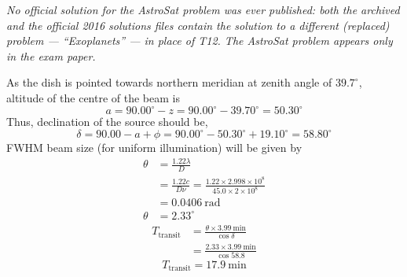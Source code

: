 \textit{No official solution for the AstroSat problem was ever published: both the archived and the official 2016 solutions files contain the solution to a different (replaced) problem --- ``Exoplanets'' --- in place of T12. The AstroSat problem appears only in the exam paper.}

As the dish is pointed towards northern meridian at zenith angle of
$39.7^\circ$, altitude of the centre of the beam is
\[
a = 90.00^\circ - z = 90.00^\circ - 39.70^\circ = 50.30^\circ \tag*{(1.0)}
\]
Thus, declination of the source should be,
\[
\delta = 90.00 - a + \phi
 = 90.00^\circ - 50.30^\circ + 19.10^\circ = 58.80^\circ \tag*{(2.0)}
\]
FWHM beam size (for uniform illumination) will be given by
\begin{align*}
\theta &= \frac{1.22\lambda}{D} \tag*{(1.5)}\\
&= \frac{1.22c}{D\nu}
 = \frac{1.22 \times 2.998 \times 10^{8}}{45.0 \times 2 \times 10^{8}}\\
&= 0.0406\ \mathrm{rad}\\
\theta &= 2.33^\circ \tag*{(1.5)}
\end{align*}
\begin{align*}
T_{\mathrm{transit}} &= \frac{\theta \times 3.99\ \mathrm{min}}{\cos\delta}
  \tag*{(3.0)}\\
&= \frac{2.33 \times 3.99\ \mathrm{min}}{\cos 58.8}
\end{align*}
\[
\boxed{T_{\mathrm{transit}} = 17.9\ \mathrm{min}} \tag*{(1.0)}
\]

